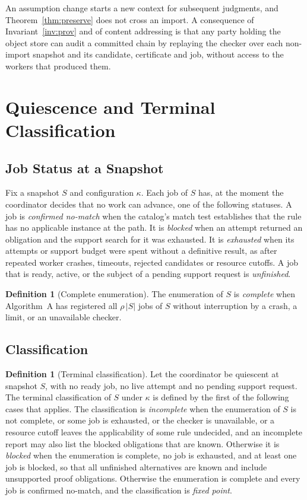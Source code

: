 \documentclass[11pt,a4paper]{article}
\theoremstyle{plain}
\theoremstyle{definition}
\newtheorem{definition}[theorem]{Definition}
\theoremstyle{remark}
\theoremstyle{definition}
\newcommand{\sz}[1]{\lvert #1\rvert}
\begin{document}
An assumption change starts a new context for subsequent judgments, and Theorem~\ref{thm:preserve} does not cross an import. A consequence of Invariant~\ref{inv:prov} and of content addressing is that any party holding the object store can audit a committed chain by replaying the checker over each non-import snapshot and its candidate, certificate and job, without access to the workers that produced them.

\section{Quiescence and Terminal Classification}
\label{sec:quiescence}

\subsection{Job Status at a Snapshot}

Fix a snapshot $S$ and configuration $\kappa$. Each job of $S$ has, at the moment the coordinator decides that no work can advance, one of the following statuses. A job is \emph{confirmed no-match} when the catalog's match test establishes that the rule has no applicable instance at the path. It is \emph{blocked} when an attempt returned an obligation and the support search for it was exhausted. It is \emph{exhausted} when its attempts or support budget were spent without a definitive result, as after repeated worker crashes, timeouts, rejected candidates or resource cutoffs. A job that is ready, active, or the subject of a pending support request is \emph{unfinished}.

\begin{definition}[Complete enumeration]
The enumeration of $S$ is \emph{complete} when Algorithm~A has registered all $\rho\,\sz{S}$ jobs of $S$ without interruption by a crash, a limit, or an unavailable checker.
\end{definition}

\subsection{Classification}

\begin{definition}[Terminal classification]
\label{def:classes}
Let the coordinator be quiescent at snapshot $S$, with no ready job, no live attempt and no pending support request. The terminal classification of $S$ under $\kappa$ is defined by the first of the following cases that applies. The classification is \emph{incomplete} when the enumeration of $S$ is not complete, or some job is exhausted, or the checker is unavailable, or a resource cutoff leaves the applicability of some rule undecided, and an incomplete report may also list the blocked obligations that are known. Otherwise it is \emph{blocked} when the enumeration is complete, no job is exhausted, and at least one job is blocked, so that all unfinished alternatives are known and include unsupported proof obligations. Otherwise the enumeration is complete and every job is confirmed no-match, and the classification is \emph{fixed point}.
\end{definition}
\end{document}
